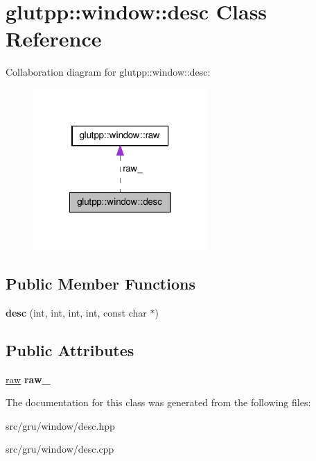 \hypertarget{classglutpp_1_1window_1_1desc}{\section{glutpp\-:\-:window\-:\-:desc \-Class \-Reference}
\label{classglutpp_1_1window_1_1desc}
}


\-Collaboration diagram for glutpp\-:\-:window\-:\-:desc\-:\nopagebreak
\begin{figure}[H]
\begin{center}
\leavevmode
\includegraphics[width=188pt]{classglutpp_1_1window_1_1desc__coll__graph}
\end{center}
\end{figure}
\subsection*{\-Public \-Member \-Functions}
\begin{DoxyCompactItemize}
\item 
\hypertarget{classglutpp_1_1window_1_1desc_ab63aad03d901472bc8fcaffce4dc84de}{{\bfseries desc} (int, int, int, int, const char $\ast$)}\label{classglutpp_1_1window_1_1desc_ab63aad03d901472bc8fcaffce4dc84de}

\end{DoxyCompactItemize}
\subsection*{\-Public \-Attributes}
\begin{DoxyCompactItemize}
\item 
\hypertarget{classglutpp_1_1window_1_1desc_ae879e3451cc166a1c28b164f88904698}{\hyperlink{structglutpp_1_1window_1_1raw}{raw} {\bfseries raw\-\_\-}}\label{classglutpp_1_1window_1_1desc_ae879e3451cc166a1c28b164f88904698}

\end{DoxyCompactItemize}


\-The documentation for this class was generated from the following files\-:\begin{DoxyCompactItemize}
\item 
src/gru/window/desc.\-hpp\item 
src/gru/window/desc.\-cpp\end{DoxyCompactItemize}
